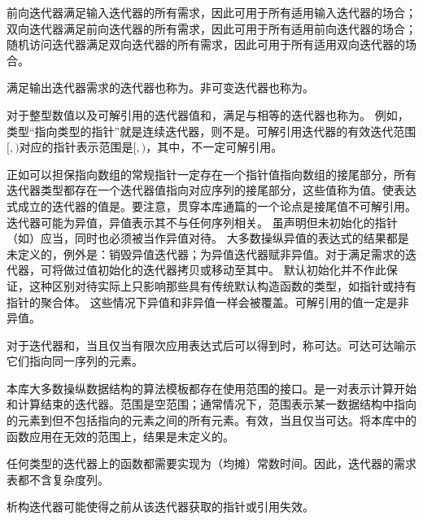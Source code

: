 \pnum
前向迭代器满足输入迭代器的所有需求，因此可用于所有适用输入迭代器的场合；双向迭代器满足前向迭代器的所有需求，因此可用于所有适用前向迭代器的场合；随机访问迭代器满足双向迭代器的所有需求，因此可用于所有适用双向迭代器的场合。

\pnum
满足输出迭代器需求的迭代器也称为。非可变迭代器也称为。

\pnum
对于整型数值以及可解引用的迭代器值和，满足与相等的迭代器也称为。
\enternote
例如，类型“指向类型的指针”就是连续迭代器，则不是。可解引用迭代器的有效迭代范围$[$$, $$)$对应的指针表示范围是$[$$, $$)$，其中，不一定可解引用。
\exitnote

\pnum
正如可以担保指向数组的常规指针一定存在一个指针值指向数组的接尾部分，所有迭代器类型都存在一个迭代器值指向对应序列的接尾部分，这些值称为值。使表达式成立的迭代器的值是。要注意，贯穿本库通篇的一个论点是接尾值不可解引用。迭代器可能为异值，异值表示其不与任何序列相关。
\enterexample
虽声明但未初始化的指针（如）应当，同时也必须被当作异值对待。
\exitexample
大多数操纵异值的表达式的结果都是未定义的，例外是：销毁异值迭代器；为异值迭代器赋非异值。对于满足需求的迭代器，可将做过值初始化的迭代器拷贝或移动至其中。
\enternote
默认初始化并不作此保证，这种区别对待实际上只影响那些具有传统默认构造函数的类型，如指针或持有指针的聚合体。
\exitnote
这些情况下异值和非异值一样会被覆盖。可解引用的值一定是非异值。

\pnum
对于迭代器和，当且仅当有限次应用表达式后可以得到时，称可达。可达可达喻示它们指向同一序列的元素。

\pnum
本库大多数操纵数据结构的算法模板都存在使用范围的接口。是一对表示计算开始和计算结束的迭代器。范围是空范围；通常情况下，范围表示某一数据结构中指向的元素到但不包括指向的元素之间的所有元素。有效，当且仅当可达。将本库中的函数应用在无效的范围上，结果是未定义的。

\pnum
任何类型的迭代器上的函数都需要实现为（均摊）常数时间。因此，迭代器的需求表都不含复杂度列。

\pnum
析构迭代器可能使得之前从该迭代器获取的指针或引用失效。

